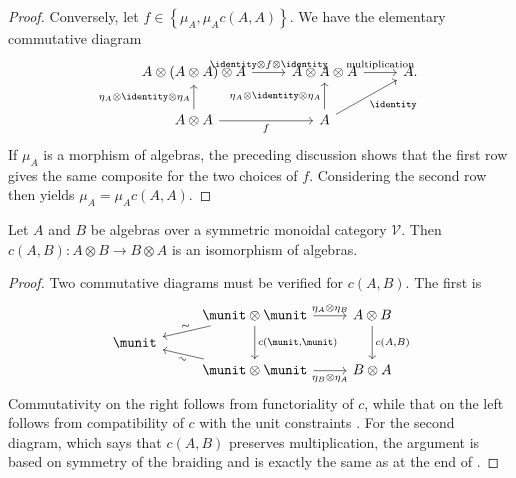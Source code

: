 \begin{proof}
	Conversely, let $f\in\left\{\mu_A,\mu_Ac(A,A)\right\}$. We have the
	elementary commutative diagram
	\[\begin{tikzcd}
		A \otimes (A \otimes A) \otimes A \arrow[r, "{\identity \otimes f \otimes \identity}"] & A \otimes A \otimes A \arrow[r, "{\text{multiplication}}"] & A . \\
		A \otimes A \arrow[u, "{\eta_A \otimes \identity \otimes \eta_A}"] \arrow[r, "f"'] & A \arrow[ru, "\identity"'] \arrow[u, "{\eta_A \otimes \identity \otimes \eta_A}"] &
	\end{tikzcd}\]
	If $\mu_A$ is a morphism of algebras, the preceding discussion shows that
	the first row gives the same composite for the two choices of $f$.
	Considering the second row then yields $\mu_A=\mu_Ac(A,A)$.
\end{proof}

\begin{lemma}\label{prop:c-as-isom-alg}
	Let $A$ and $B$ be algebras over a symmetric monoidal category
	$\mathcal{V}$. Then $c(A,B):A\otimes B\to B\otimes A$ is an isomorphism
	of algebras.
\end{lemma}
\begin{proof}
	Two commutative diagrams must be verified for $c(A,B)$. The first is
	\[\begin{tikzcd}[row sep=tiny]
		& \munit \otimes \munit \arrow[ld, "\sim" sloped] \arrow[dd, "{c(\munit, \munit)}"] \arrow[r, "{\eta_A \otimes \eta_B}"] & A \otimes B \arrow[dd, "{c(A, B)}"] \\
		\munit & & \\
		& \munit \otimes \munit \arrow[lu, "\sim"' sloped] \arrow[r, "{\eta_B \otimes \eta_A}"'] & B \otimes A
	\end{tikzcd}\]
	Commutativity on the right follows from functoriality of $c$, while that
	on the left follows from compatibility of $c$ with the unit constraints
	\cite[(3.12)]{Li1}. For the second diagram, which says that $c(A,B)$
	preserves multiplication, the argument is based on symmetry of the
	braiding and is exactly the same as at the end of \cite[\S 7.4]{Li1}.
\end{proof}

